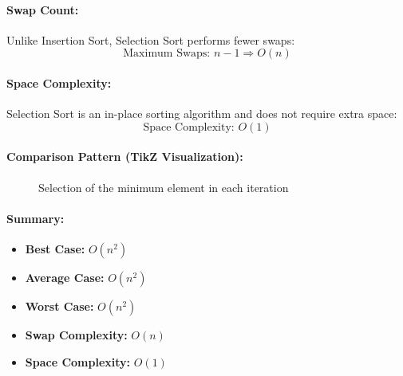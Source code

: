 \paragraph{Swap Count:}

Unlike Insertion Sort, Selection Sort performs fewer swaps:
\[
\text{Maximum Swaps: } n - 1 \Rightarrow \boxed{O(n)}
\]

\paragraph{Space Complexity:}

Selection Sort is an in-place sorting algorithm and does not require extra space:
\[
\boxed{\text{Space Complexity: } O(1)}
\]

\paragraph{Comparison Pattern (TikZ Visualization):}

\begin{figure}[H]
\centering
{}
\caption{Selection of the minimum element in each iteration}
\end{figure}

\paragraph{Summary:}

\begin{itemize}
  \item \textbf{Best Case:} \(\boxed{O(n^2)}\)
  \item \textbf{Average Case:} \(\boxed{O(n^2)}\)
  \item \textbf{Worst Case:} \(\boxed{O(n^2)}\)
  \item \textbf{Swap Complexity:} \(\boxed{O(n)}\)
  \item \textbf{Space Complexity:} \(\boxed{O(1)}\)
\end{itemize}


